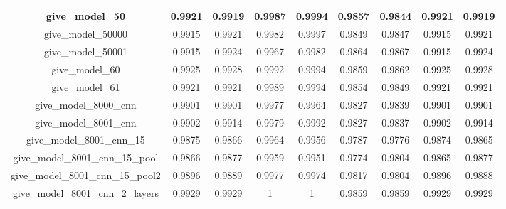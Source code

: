 \begin{table}[!h]
\begin{tabular} {|c|c|c|c|c|c|c|c|c| }
        give\_model\_50                   & 0.9921                        & 0.9919                         & 0.9987                      & 0.9994                  & 0.9857 & 0.9844 & 0.9921 & 0.9919 \\ \hline
        give\_model\_50000                & 0.9915                        & 0.9921                         & 0.9982                      & 0.9997                  & 0.9849 & 0.9847 & 0.9915 & 0.9921 \\ \hline
        give\_model\_50001                & 0.9915                        & 0.9924                         & 0.9967                      & 0.9982                  & 0.9864 & 0.9867 & 0.9915 & 0.9924 \\ \hline
        give\_model\_60                   & 0.9925                        & 0.9928                         & 0.9992                      & 0.9994                  & 0.9859 & 0.9862 & 0.9925 & 0.9928 \\ \hline
        give\_model\_61                   & 0.9921                        & 0.9921                         & 0.9989                      & 0.9994                  & 0.9854 & 0.9849 & 0.9921 & 0.9921 \\ \hline
        give\_model\_8000\_cnn            & 0.9901                        & 0.9901                         & 0.9977                      & 0.9964                  & 0.9827 & 0.9839 & 0.9901 & 0.9901 \\ \hline
        give\_model\_8001\_cnn            & 0.9902                        & 0.9914                         & 0.9979                      & 0.9992                  & 0.9827 & 0.9837 & 0.9902 & 0.9914 \\ \hline
        give\_model\_8001\_cnn\_15        & 0.9875                        & 0.9866                         & 0.9964                      & 0.9956                  & 0.9787 & 0.9776 & 0.9874 & 0.9865 \\ \hline
        give\_model\_8001\_cnn\_15\_pool  & 0.9866                        & 0.9877                         & 0.9959                      & 0.9951                  & 0.9774 & 0.9804 & 0.9865 & 0.9877 \\ \hline
        give\_model\_8001\_cnn\_15\_pool2 & 0.9896                        & 0.9889                         & 0.9977                      & 0.9974                  & 0.9817 & 0.9804 & 0.9896 & 0.9888 \\ \hline
        give\_model\_8001\_cnn\_2\_layers & 0.9929                        & 0.9929                         & 1                           & 1                       & 0.9859 & 0.9859 & 0.9929 & 0.9929 \\ \hline

\end{tabular}
\end{table}
